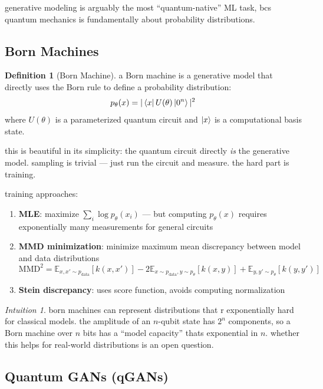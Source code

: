 \documentclass[11pt,a4paper]{article}
\theoremstyle{definition}
\newtheorem{definition}{Definition}[section]
\theoremstyle{remark}
\newtheorem*{intuition}{Intuition}
\begin{document}
generative modeling is arguably the most ``quantum-native'' ML task, bcs quantum mechanics is fundamentally about probability distributions.

\subsection{Born Machines}

\begin{definition}[Born Machine]
a Born machine is a generative model that directly uses the Born rule to define a probability distribution:
\begin{equation}
    p_\theta(x) = |\bra{x} U(\theta) \ket{0^n}|^2
\end{equation}
where $U(\theta)$ is a parameterized quantum circuit and $\ket{x}$ is a computational basis state.
\end{definition}

this is beautiful in its simplicity: the quantum circuit directly \emph{is} the generative model. sampling is trivial --- just run the circuit and measure. the hard part is training.

training approaches:
\begin{enumerate}[label=(\roman*)]
    \item \textbf{MLE}: maximize $\sum_i \log p_\theta(x_i)$ --- but computing $p_\theta(x)$ requires exponentially many measurements for general circuits
    \item \textbf{MMD minimization}: minimize maximum mean discrepancy between model and data distributions
    \begin{equation}
        \text{MMD}^2 = \mathbb{E}_{x,x' \sim p_{\text{data}}}[k(x,x')] - 2\mathbb{E}_{x \sim p_{\text{data}}, y \sim p_\theta}[k(x,y)] + \mathbb{E}_{y,y' \sim p_\theta}[k(y,y')]
    \end{equation}
    \item \textbf{Stein discrepancy}: uses score function, avoids computing normalization
\end{enumerate}

\begin{intuition}
born machines can represent distributions that r exponentially hard for classical models. the amplitude of an $n$-qubit state has $2^n$ components, so a Born machine over $n$ bits has a ``model capacity'' thats exponential in $n$. whether this helps for real-world distributions is an open question.
\end{intuition}

\subsection{Quantum GANs (qGANs)}
\end{document}
